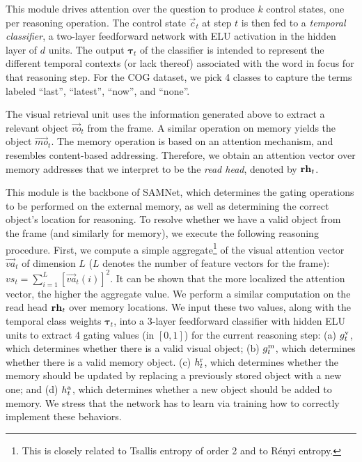 This module drives attention over the question to produce $k$ control states, one per reasoning operation.
The control state $\vec{c}_t$ at step $t$ is then fed to a \emph{temporal classifier}, 
a two-layer feedforward network with ELU activation in the hidden layer of $d$ units.
The output $\bm{\tau}_t$ of the classifier is intended to represent the different temporal contexts (or lack thereof) associated with the word in focus for that reasoning step.	
For the COG dataset, we pick 4 classes to capture the terms labeled ``last'', ``latest'', ``now'', and ``none''.

The visual retrieval unit uses the information generated above to extract a relevant object $\vec{vo}_t$ from the frame.
A similar operation on memory yields the object $\vec{mo}_t$. The memory operation is based on an attention mechanism, and resembles content-based addressing. Therefore, we obtain an attention vector over memory addresses that we interpret to be the \emph{read head}, denoted by $\mathbf{rh}_t$.

This module is the backbone of SAMNet, which determines the gating operations to be performed on the external memory, as well as determining the correct object's location for reasoning.
To resolve whether we have a valid object from the frame (and similarly for memory), we execute the following reasoning procedure.
First, we compute a simple aggregate\footnote{%
	This is closely related to Tsallis entropy of order 2 and to R\'{e}nyi entropy.} of the visual attention vector $\vec{va}_t$ of dimension $L$ ($L$ denotes the number of feature vectors for the frame):
$vs_t = \sum_{i=1}^L [\vec{va}_t(i)]^2$. It can be shown that the more localized the attention
vector, the higher the aggregate value.
We perform a similar computation on the read head $\mathbf{rh}_t$ over memory locations.
We input these two values, along with the temporal class weights $\bm{\tau}_t$, into a 3-layer feedforward classifier with hidden ELU units to extract 4 gating values (in $[0,1]$) for the current reasoning step:
(a) $g^{\mathrm{v}}_t$, which determines whether there is a valid visual object;
(b) $g^{\mathrm{m}}_t$, which determines whether there is a valid memory object. 
(c) $h^{\mathrm{r}}_t$, which determines whether the memory should be updated by replacing a previously stored object with a new one; and
(d) $h^{\mathrm{a}}_t$, which determines whether a new object should be added to memory.
We stress that the network has to learn via training how to correctly implement these behaviors.

